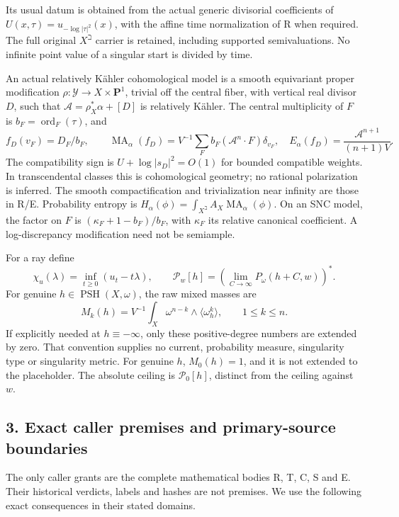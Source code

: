 \documentclass[
  11pt,
]{article}
\begin{document}
Its usual datum is obtained from the actual generic divisorial
coefficients of \(U(x,\tau)=u_{-\log|\tau|^2}(x)\), with the affine time
normalization of R when required. The full original \(X^\beth\) carrier
is retained, including supported semivaluations. No infinite point value
of a singular start is divided by time.

An actual relatively Kähler cohomological model is a smooth equivariant
proper modification \(\rho:\mathcal Y\to
X\times\mathbf P^1\), trivial off the central fiber, with vertical real
divisor \(D\), such that \(\mathcal A=\rho_X^*\alpha+[D]\) is relatively
Kähler. The central multiplicity of \(F\) is
\(b_F=\operatorname{ord}_F(\tau)\), and \[
f_D(v_F)=D_F/b_F,\qquad
\operatorname{MA}_\alpha(f_D)=V^{-1}\sum_F b_F(\mathcal A^n\cdot F)\delta_{v_F},
\quad E_\alpha(f_D)=\frac{\mathcal A^{n+1}}{(n+1)V}.        \tag{3}
\] The compatibility sign is \(U+\log|s_D|^2=O(1)\) for bounded
compatible weights. In transcendental classes this is cohomological
geometry; no rational polarization is inferred. The smooth
compactification and trivialization near infinity are those in R/E.
Probability entropy is
\(H_\alpha(\phi)=\int_{X^\beth}A_X\operatorname{MA}_\alpha(\phi)\). On
an SNC model, the factor on \(F\) is \((\kappa_F+1-b_F)/b_F\), with
\(\kappa_F\) its relative canonical coefficient. A log-discrepancy
modification need not be semiample.

For a ray define \[
\chi_u(\lambda)=\inf_{t\ge0}(u_t-t\lambda),\qquad
\mathscr P_w[h]=\left(\lim_{C\to\infty}P_\omega(h+C,w)\right)^*.
                                                               \tag{4}
\] For genuine \(h\in\operatorname{PSH}(X,\omega)\), the raw mixed
masses are \[
M_k(h)=V^{-1}\int_X\omega^{n-k}\wedge
                \langle\omega_h^k\rangle,\qquad1\le k\le n.   \tag{5}
\] If explicitly needed at \(h\equiv-\infty\), only these
positive-degree numbers are extended by zero. That convention supplies
no current, probability measure, singularity type or singularity metric.
For genuine \(h\), \(M_0(h)=1\), and it is not extended to the
placeholder. The absolute ceiling is \(\mathscr P_0[h]\), distinct from
the ceiling against \(w\).

\subsection{3. Exact caller premises and primary-source
boundaries}\label{exact-caller-premises-and-primary-source-boundaries}

The only caller grants are the complete mathematical bodies R, T, C, S
and E. Their historical verdicts, labels and hashes are not premises. We
use the following exact consequences in their stated domains.
\end{document}
